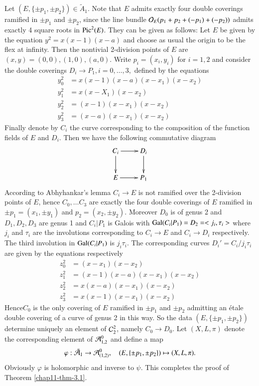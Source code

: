 Let $(E,\{\pm p_{1}, \pm p_{2}\}) \in \tilde{A}_{1}$. Note that $E$ admits exactly four double coverings ramified
in $\pm p_{1}$ and $\pm p_{2}$, since the line bundle $\mathcal{O}_{E}(p_{1} +p_{2} + (-p_{1})+(-p_{2}))$ admits exactly 4 square roots in $\operatorname{Pic}^{2}(E)$. They can be given as  follows: Let $E$ be given by the equation $y^{2} =x(x-1)(x-a)$ and choose as usual the origin to be the flex at infinity. Then the nontivial 2-division points of $E$ are $(x,y) =(0,0),(1,0),(a,0)$. Write $p_{i} =(x_{i},y_{i})$ for $i=1,2$ and consider the double coverings $D_{i}\rightarrow P_{1}, i=0, \ldots,3,$ defined by the equations
\begin{align*}
y_{0}^{2} &= x(x-1)(x-a)(x-x_{1})(x-x_{2})\\
y_{1}^{2} &= x(x-X_{1})(x-x_{2})\\
y_{2}^{2} &= (x-1)(x-x_{1})(x-x_{2})\\
y_{3}^{2} &=(x-a)(x-x_{1})(x-x_{2})
\end{align*}
Finally denote by $C_{i}$ the curve corresponding to the composition of the function fields of $E$ and $D_{i}$. Then we have the following commutative diagram
$$
\xymatrix{
C_{i} \ar[r] \ar[d] & D_{i}\ar[d]\\
E\ar[r] & P_{1} }
$$
According to Abhyhankar's lemma $C_{i} \rightarrow E$ is not ramified over the 2-division points of $E$, hence $C_{0}, \ldots C_{3}$ are exactly the four double coverings of $E$ ramified in $\pm p_{1} =(x_{1}, \pm y_{1})$ and $ p_{2} =(x_{2},\pm y_{2})$. Moreover $D_{0}$ is of genus 2 and $D_{1}, D_{2}, D_{3}$ are genus 1 and $C_{i} |P_{1}$ is Galois with $\operatorname{Gal}(C_{i}|P_{1}) = D_{2} =<j_{i}, \tau_{i} >$ where $j_{i}$ and $\tau_{i}$ are the involutions corresponding to $C_{i}\rightarrow E$ and $ C_{i} \rightarrow D_{i}$ respectively. The third involution in $\operatorname{Gal}(C_{i} |P_{1})$ is $j_{i}\tau_{i}$. The corresponding curves $D_{i}'=C_{i}/j_{i}\tau_{i}$ are given by the equations respectively
\begin{align*}
z_{0}^{2} &= (x-x_{1})(x-x_{2})\\
z_{1}^{2} &= (x-1)(x-a)(x-x_{1})(x-x_{2})\\
z_{2}^{2} &= x(x-a)(x-x_{1})(x-x_{2})\\
z_{3}^{2} &= x(x-1)(x-x_{1})(x-x_{2})
\end{align*}
Hence\pageoriginale $C_{0}$ is the only covering of $E$ ramified in $\pm p_{1}$ and $\pm p_{2}$ admitting an \'etale double covering of a curve of genus 2 in this way. So the data $(E, \{\pm p_{1}, \pm p_{2}\})$ determine uniquely an element of $\mathcal{C}_{2}^{2}$, namely $C_{0}\rightarrow D_{0}$. Let $(X, L, \pi)$ denote the corresponding element of $\mathcal{A}_{1,2}^{0}$ and define a map
$$
\varphi : \tilde{\mathcal{A}}_{1} \rightarrow \mathcal{A}_{(1,2)}^{0}, \quad (E, \{\pm p_{1}, \pm p_{2}\}) \mapsto (X, L, \pi).
$$
Obviously $\varphi$ is holomorphic and inverse to $\psi$. This completes the proof of Theorem \ref{chap11-thm-3.1}.

